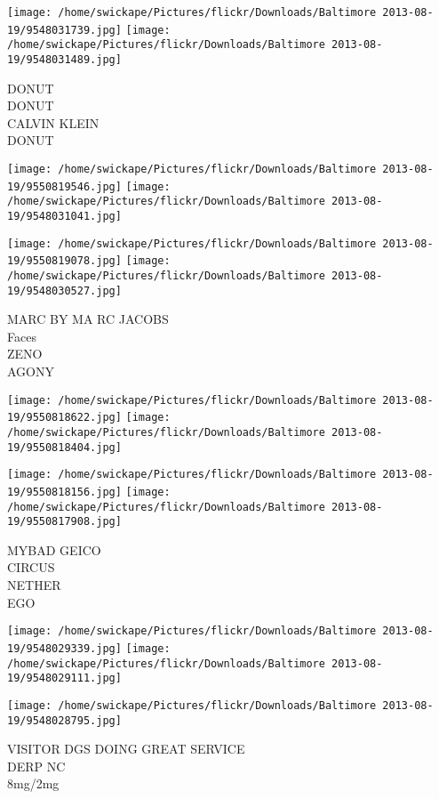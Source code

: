 \documentclass[10pt,letterpaper]{article}
\begin{document}
\texttt{[image: /home/swickape/Pictures/flickr/Downloads/Baltimore 2013-08-19/9548031739.jpg]}
\texttt{[image: /home/swickape/Pictures/flickr/Downloads/Baltimore 2013-08-19/9548031489.jpg]}

DONUT\\
DONUT\\
CALVIN KLEIN\\
DONUT\\
\pagebreak

\texttt{[image: /home/swickape/Pictures/flickr/Downloads/Baltimore 2013-08-19/9550819546.jpg]}
\texttt{[image: /home/swickape/Pictures/flickr/Downloads/Baltimore 2013-08-19/9548031041.jpg]}

\texttt{[image: /home/swickape/Pictures/flickr/Downloads/Baltimore 2013-08-19/9550819078.jpg]}
\texttt{[image: /home/swickape/Pictures/flickr/Downloads/Baltimore 2013-08-19/9548030527.jpg]}

MARC BY MA RC JACOBS\\
Faces\\
ZENO\\
AGONY\\
\pagebreak

\texttt{[image: /home/swickape/Pictures/flickr/Downloads/Baltimore 2013-08-19/9550818622.jpg]}
\texttt{[image: /home/swickape/Pictures/flickr/Downloads/Baltimore 2013-08-19/9550818404.jpg]}

\texttt{[image: /home/swickape/Pictures/flickr/Downloads/Baltimore 2013-08-19/9550818156.jpg]}
\texttt{[image: /home/swickape/Pictures/flickr/Downloads/Baltimore 2013-08-19/9550817908.jpg]}

MYBAD GEICO\\
CIRCUS\\
NETHER\\
EGO\\
\pagebreak

\texttt{[image: /home/swickape/Pictures/flickr/Downloads/Baltimore 2013-08-19/9548029339.jpg]}
\texttt{[image: /home/swickape/Pictures/flickr/Downloads/Baltimore 2013-08-19/9548029111.jpg]}

\vspace{0.25in}
\texttt{[image: /home/swickape/Pictures/flickr/Downloads/Baltimore 2013-08-19/9548028795.jpg]}

VISITOR DGS DOING GREAT SERVICE\\
DERP NC\\
8mg/2mg\\
\pagebreak
\end{document}
